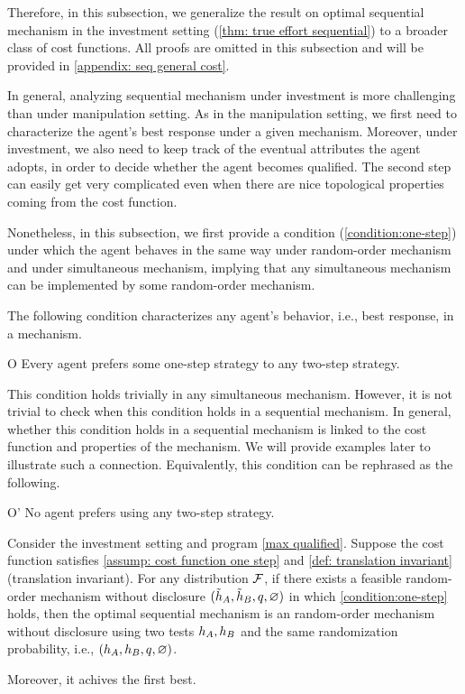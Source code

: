 Therefore, in this subsection, we generalize the result on optimal sequential mechanism in the investment setting (\cref{thm: true effort sequential}) to a broader class of cost functions. 
All proofs are omitted in this subsection and will be provided in \cref{appendix: seq general cost}.

In general, analyzing sequential mechanism under investment is more challenging than under manipulation setting.
As in the manipulation setting, we first need to characterize the agent's best response under a given mechanism.
Moreover, under investment, we also need to keep track of the eventual attributes the agent adopts, in order to decide whether the agent becomes qualified.
The second step can easily get very complicated even when there are nice topological properties coming from the cost function.

Nonetheless, in this subsection, we first provide a condition (\cref{condition:one-step}) under which the agent behaves in the same way under random-order mechanism and under simultaneous mechanism, implying that any simultaneous mechanism can be implemented by some random-order mechanism.

The following condition characterizes any agent's behavior, i.e., best response, in a mechanism.
\begin{conditionp}{O}\label{condition:one-step}
     Every agent prefers some one-step strategy to any two-step strategy.
\end{conditionp}

This condition holds trivially in any simultaneous mechanism.
However, it is not trivial to check when this condition holds in a sequential mechanism.
In general, whether this condition holds in a sequential mechanism is linked to  the cost function and properties of the mechanism.
We will provide examples later to illustrate such a connection.
Equivalently, this condition can be rephrased as the following.

\begin{conditionp}{O'}\label{condition:one-step'}
     No agent prefers using any two-step strategy.
\end{conditionp}

\begin{proposition}\label{lem: optimal max qualified improving effort}
    Consider  the investment setting and program \ref{max qualified}.
    Suppose the cost function satisfies \cref{assump: cost function one step} and \ref{def: translation invariant} (translation invariant).   
    For any distribution $\mathcal{F}$, if there exists a feasible  random-order mechanism without disclosure $(\tilde {h}_A, \tilde {h}_B,q,\varnothing)$ in which \cref{condition:one-step} holds, then the optimal sequential mechanism is an  random-order mechanism without disclosure using two tests $h_A,h_B$ and the same randomization probability, i.e., $( h_A,  h_B,q,\varnothing)$. 
    
    Moreover, it achives the first best.
\end{proposition}


